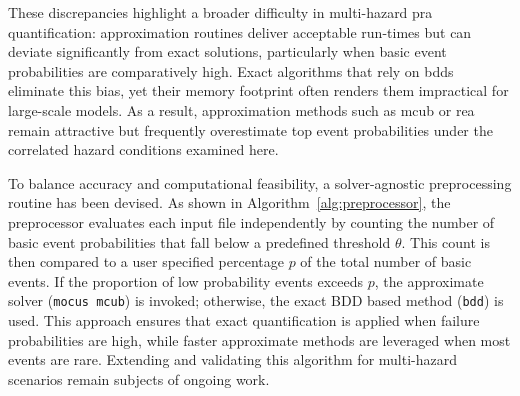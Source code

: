 

These discrepancies highlight a broader difficulty in multi-hazard \acrshort{pra} quantification: approximation routines deliver acceptable run-times but can deviate significantly from exact solutions, particularly when basic event probabilities are comparatively high. Exact algorithms that rely on \acrshort{bdd}s eliminate this bias, yet their memory footprint often renders them impractical for large-scale models. As a result, approximation methods such as \acrshort{mcub} or \acrshort{rea} remain attractive but frequently overestimate top event probabilities under the correlated hazard conditions examined here.



To balance accuracy and computational feasibility, a solver-agnostic preprocessing routine has been devised. As shown in Algorithm~\ref{alg:preprocessor}, the preprocessor evaluates each input file independently by counting the number of basic event probabilities that fall below a predefined threshold $\theta$. This count is then compared to a user specified percentage $p$ of the total number of basic events. If the proportion of low probability events exceeds $p$, the approximate solver (\texttt{mocus mcub}) is invoked; otherwise, the exact BDD based method (\texttt{bdd}) is used. This approach ensures that exact quantification is applied when failure probabilities are high, while faster approximate methods are leveraged when most events are rare. Extending and validating this algorithm for multi-hazard scenarios remain subjects of ongoing work.